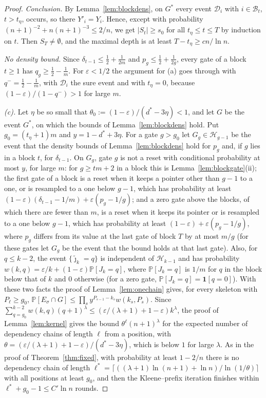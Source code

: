 \documentclass[11pt]{amsart}
\theoremstyle{definition}
\theoremstyle{remark}
\newcommand{\eps}{\varepsilon}
\newcommand{\jt}{\tilde{\jmath}}
\newcommand{\PP}{\mathbb{P}}
\begin{document}
\begin{proof}
\emph{Conclusion.} By Lemma~\ref{lem:blockdens}, on $G^*$ every event $\mathcal D_i$ with
$i\in\mathcal B_t$, $t>t_\eta$, occurs, so there $Y'_i=Y_i$. Hence, except with probability
$(n+1)^{-2}+n(n+1)^{-3}\le2/n$, we get $|S_t|\ge s_0$ for all $t_\eta\le t\le T$ by induction on
$t$. Then $S_T\ne\emptyset$, and the maximal depth is at least $T-t_\eta\ge cn/\ln n$.

\emph{No density bound.} Since $\delta_{t-1}\le\frac12+\frac1{2m}$ and $p_g\le\frac12+\frac1{2g}$,
every gate of a block $t\ge1$ has $q_g\ge\frac12-\frac1m$. For $\eps<1/2$ the argument for (a)
goes through with $q^-=\frac12-\frac1m$, with $\mathcal D_i$ the sure event and with $t_\eta=0$,
because $(1-\eps)/(1-q^-)>1$ for large $m$.

\emph{(c).} Let $\eta$ be so small that $\theta_0:=(1-\eps)/(d^*-3\eta)<1$, and let $G$ be the
event $G^*$, on which the bounds of Lemma~\ref{lem:blockdens} hold. Put $g_0=(t_\eta+1)m$ and
$y=1-d^*+3\eta$. For a gate $g>g_0$ let $G_g\in\mathcal H_{g-1}$ be the event that the density
bounds of Lemma~\ref{lem:blockdens} hold for $p_g$ and, if $g$ lies in a block $t$, for
$\delta_{t-1}$. On $G_g$, gate $g$ is not a reset with conditional probability at most $y$, for
large $m$: for $g\ge tm+2$ in a block this is Lemma~\ref{lem:blockgate}(ii); the first gate of a
block is a reset when it keeps a pointer other than $g-1$ to a one, or is resampled to a one below
$g-1$, which has probability at least $(1-\eps)(\delta_{t-1}-1/m)+\eps(p_g-1/g)$; and a zero gate
above the blocks, of which there are fewer than $m$, is a reset when it keeps its pointer or is
resampled to a one below $g-1$, which has probability at least $(1-\eps)+\eps(p_g-1/g)$, where
$p_g$ differs from its value at the last gate of block $T$ by at most $m/g$ (for these gates let
$G_g$ be the event that the bound holds at that last gate). Also, for $q\le k-2$, the event
$\{\jt_k=q\}$ is independent of $\mathcal H_{k-1}$ and has probability
$w(k,q)=\eps/k+(1-\eps)\PP[J_k=q]$, where $\PP[J_k=q]$ is $1/m$ for $q$ in the block below that of
$k$ and $0$ otherwise (for a zero gate, $\PP[J_k=q]=\mathbf 1[q=0]$). With these two facts the
proof of Lemma~\ref{lem:onechain} gives, for every skeleton with $P_\ell\ge g_0$,
$\PP[E_\sigma\cap G]\le\prod_s y^{P_{s-1}-k_s}w(k_s,P_s)$. Since
$\sum_{q=g_0}^{k-2}w(k,q)(q+1)^\lambda\le(\eps/(\lambda+1)+1-\eps)k^\lambda$, the proof of
Lemma~\ref{lem:kernel} gives the bound $\theta^\ell(n+1)^\lambda$ for the expected number of
dependency chains of length $\ell$ from a position, with
$\theta=(\eps/(\lambda+1)+1-\eps)/(d^*-3\eta)$, which is below $1$ for large $\lambda$. As in the
proof of Theorem~\ref{thm:fixed}, with probability at least $1-2/n$ there is no dependency chain of
length $\ell^*=\lceil((\lambda+1)\ln(n+1)+\ln n)/\ln(1/\theta)\rceil$ with all positions at least
$g_0$, and then the Kleene--prefix iteration finishes within $\ell^*+g_0-1\le C'\ln n$ rounds.
\end{proof}
\end{document}
